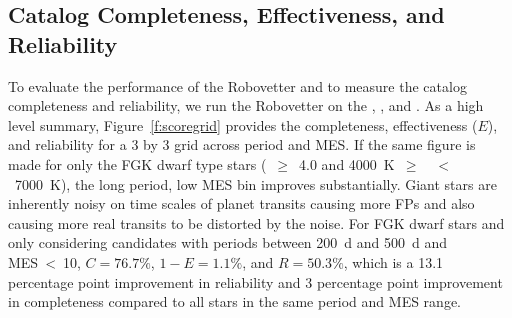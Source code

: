 \subsection{Catalog Completeness, Effectiveness, and Reliability}
\label{s:candr}

To evaluate the performance of the Robovetter and to measure the catalog completeness and reliability, we run the Robovetter on the , , and . As a high level summary, Figure~\ref{f:scoregrid} provides the completeness, effectiveness ($E$), and reliability for a 3 by 3 grid across period and MES. If the same figure is made for only the FGK dwarf type stars (\logg~$\ge$~4.0 and 4000~K~$\ge$~\tstar~$<$~7000~K), the long period, low MES bin improves substantially. Giant stars are inherently noisy on time scales of planet transits \citep[see Figure~9 of][]{Christiansen2012} causing more FPs and also causing more real transits to be distorted by the noise. For FGK dwarf stars and only considering candidates with periods between 200~d and 500~d and MES~<~10, $C=76.7\%$, $1-E=1.1\%$, and $R=50.3\%$, which is a 13.1 percentage point improvement in reliability and 3 percentage point improvement in completeness compared to all stars in the same period and MES range.

